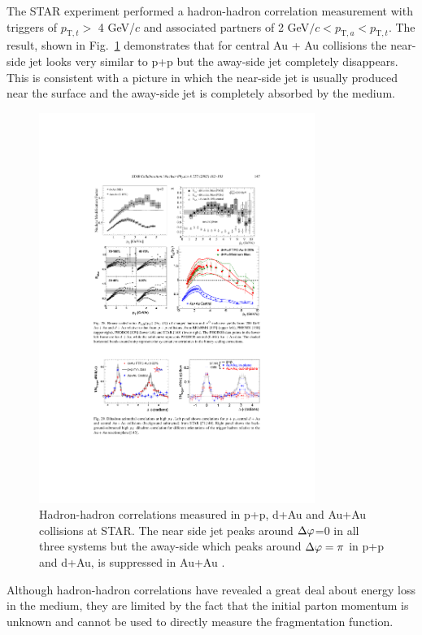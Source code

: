   The STAR experiment performed a hadron-hadron correlation measurement with triggers of $p_{\mathrm{T},t}>$ 4 GeV/$c$ and associated partners of 2 GeV$/c<p_{\mathrm{T},a}<p_{\mathrm{T},t}$. The result, shown in Fig.~\ref{fig:dihadron_correlation} demonstrates that for central Au + Au collisions the near-side jet looks very similar to p+p but the away-side jet completely disappears. This is consistent with a picture in which the near-side jet is usually produced near the surface and the away-side jet is completely absorbed by the medium.

  \begin{figure}[htpb]
    \centering
    \includegraphics[width=0.8\textwidth]{Introduction/star_dihadron.pdf}
    \caption{Hadron-hadron correlations measured in p+p, d+Au and Au+Au collisions at STAR. The near side jet peaks around $\Delta\varphi$=0 in all three systems but the away-side which peaks around $\Delta\varphi=\pi$ in p+p and d+Au, is suppressed in Au+Au \cite{Adams2005}.}
    \label{fig:dihadron_correlation}
  \end{figure}

Although hadron-hadron correlations have revealed a great deal about energy loss in the medium, they are limited by the fact that the initial parton momentum is unknown and cannot be used to directly measure the fragmentation function.

